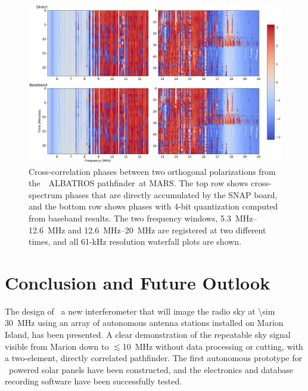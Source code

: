\begin{figure}
	\centering
	\includegraphics[width=\linewidth]{"Figures/cross mars"}
	\caption{Cross-correlation phases between two orthogonal polarizations from the  ALBATROS pathfinder at MARS. The top row shows cross-spectrum phases that are directly accumulated by the SNAP board, and the bottom row shows phases with 4-bit quantization computed from baseband results. The two frequency windows, \SIrange{5.3}{12.6}{\mega \hertz} and \SIrange{12.6}{20}{\mega \hertz} are registered at two different times, and all 61-kHz resolution waterfall plots are shown.}
	\label{Fig:crossmars}
\end{figure}


\section{Conclusion and Future Outlook}

The design of \albatros\, a new interferometer that will image the radio sky at \SI{\sim 30}{\mega \hertz} using an array of autonomous antenna stations installed on Marion Island, has been presented. A clear demonstration of the repeatable sky signal visible from Marion down to $\lesssim$10~MHz without data processing or cutting, with a two-element, directly correlated pathfinder. The first autonomous prototype for \albatros\ powered solar panels have been constructed, and the electronics and database recording software have been successfully tested.

